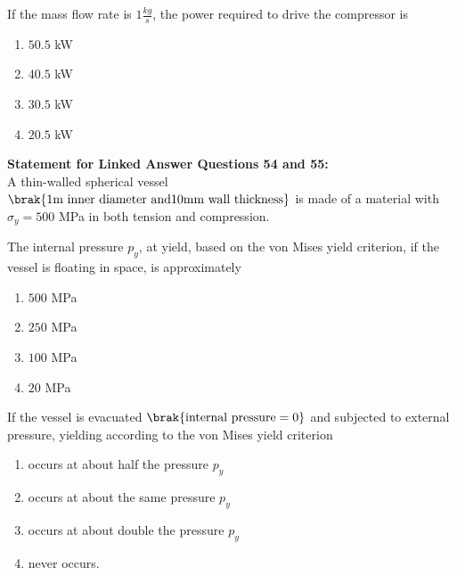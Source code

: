 \iffalse
                       
                        
                        
                        
                    
                        \author{AI24BTECH11006 - Bugada Roopansha}
                        \section{AE}
                        \chapter{20012}
                        \fi
 
    \item If the mass flow rate is $1 \frac{kg}{s}$, the power required to drive the compressor is
    \begin{enumerate}
        \item $50.5$ kW
        \item $40.5$ kW
        \item $30.5$ kW
        \item $20.5$ kW
    \end{enumerate}

    \textbf{Statement for Linked Answer Questions 54 and 55:} \\
    A thin-walled spherical vessel $\brak{1 \text{m inner diameter and} 10 \text{mm wall thickness}}$ is made of a material with $\sigma_y = 500$ MPa in both tension and compression.

    \item The internal pressure $p_y$, at yield, based on the von Mises yield criterion, if the vessel is floating in space, is approximately
    \begin{enumerate}
        \item $500$ MPa
        \item $250$ MPa
        \item $100$ MPa
        \item $20$ MPa
    \end{enumerate}

    \item If the vessel is evacuated $\brak{\text{internal pressure} =0}$ and subjected to external pressure, yielding according to the von Mises yield criterion 
    \begin{enumerate}
        \item occurs at about half the pressure $p_y$
        \item occurs at about the same pressure $p_y$
        \item occurs at about double the pressure $p_y$
        \item never occurs.
    \end{enumerate}


